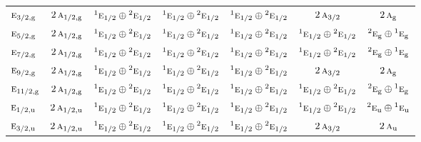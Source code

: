 \documentclass[10pt,a4paper]{article}
\numberwithin{equation}{section}
\newcommand{\irr}[1]{\text{\normalfont\scshape #1}}
\newcommand{\conjpair}[1]{{}^{#1}}
\newcommand{\ptag}[1]{\mathrm{#1}}
\begin{document}
{\begin{longtable}{@{}lcccccc@{}}
$\irr{e}_{3/2,\ptag{g}}$ & $2\,\irr{a}_{1/2,\ptag{g}}$ & $\conjpair{1}\irr{e}_{1/2}\oplus \conjpair{2}\irr{e}_{1/2}$ & $\conjpair{1}\irr{e}_{1/2}\oplus \conjpair{2}\irr{e}_{1/2}$ & $\conjpair{1}\irr{e}_{1/2}\oplus \conjpair{2}\irr{e}_{1/2}$ & $2\,\irr{a}_{3/2}$ & $2\,\irr{a}_{\ptag{g}}$\\
$\irr{e}_{5/2,\ptag{g}}$ & $2\,\irr{a}_{1/2,\ptag{g}}$ & $\conjpair{1}\irr{e}_{1/2}\oplus \conjpair{2}\irr{e}_{1/2}$ & $\conjpair{1}\irr{e}_{1/2}\oplus \conjpair{2}\irr{e}_{1/2}$ & $\conjpair{1}\irr{e}_{1/2}\oplus \conjpair{2}\irr{e}_{1/2}$ & $\conjpair{1}\irr{e}_{1/2}\oplus \conjpair{2}\irr{e}_{1/2}$ & $\conjpair{2}\irr{e}_{\ptag{g}}\oplus \conjpair{1}\irr{e}_{\ptag{g}}$\\
$\irr{e}_{7/2,\ptag{g}}$ & $2\,\irr{a}_{1/2,\ptag{g}}$ & $\conjpair{1}\irr{e}_{1/2}\oplus \conjpair{2}\irr{e}_{1/2}$ & $\conjpair{1}\irr{e}_{1/2}\oplus \conjpair{2}\irr{e}_{1/2}$ & $\conjpair{1}\irr{e}_{1/2}\oplus \conjpair{2}\irr{e}_{1/2}$ & $\conjpair{1}\irr{e}_{1/2}\oplus \conjpair{2}\irr{e}_{1/2}$ & $\conjpair{2}\irr{e}_{\ptag{g}}\oplus \conjpair{1}\irr{e}_{\ptag{g}}$\\
$\irr{e}_{9/2,\ptag{g}}$ & $2\,\irr{a}_{1/2,\ptag{g}}$ & $\conjpair{1}\irr{e}_{1/2}\oplus \conjpair{2}\irr{e}_{1/2}$ & $\conjpair{1}\irr{e}_{1/2}\oplus \conjpair{2}\irr{e}_{1/2}$ & $\conjpair{1}\irr{e}_{1/2}\oplus \conjpair{2}\irr{e}_{1/2}$ & $2\,\irr{a}_{3/2}$ & $2\,\irr{a}_{\ptag{g}}$\\
$\irr{e}_{11/2,\ptag{g}}$ & $2\,\irr{a}_{1/2,\ptag{g}}$ & $\conjpair{1}\irr{e}_{1/2}\oplus \conjpair{2}\irr{e}_{1/2}$ & $\conjpair{1}\irr{e}_{1/2}\oplus \conjpair{2}\irr{e}_{1/2}$ & $\conjpair{1}\irr{e}_{1/2}\oplus \conjpair{2}\irr{e}_{1/2}$ & $\conjpair{1}\irr{e}_{1/2}\oplus \conjpair{2}\irr{e}_{1/2}$ & $\conjpair{2}\irr{e}_{\ptag{g}}\oplus \conjpair{1}\irr{e}_{\ptag{g}}$\\
$\irr{e}_{1/2,\ptag{u}}$ & $2\,\irr{a}_{1/2,\ptag{u}}$ & $\conjpair{1}\irr{e}_{1/2}\oplus \conjpair{2}\irr{e}_{1/2}$ & $\conjpair{1}\irr{e}_{1/2}\oplus \conjpair{2}\irr{e}_{1/2}$ & $\conjpair{1}\irr{e}_{1/2}\oplus \conjpair{2}\irr{e}_{1/2}$ & $\conjpair{1}\irr{e}_{1/2}\oplus \conjpair{2}\irr{e}_{1/2}$ & $\conjpair{2}\irr{e}_{\ptag{u}}\oplus \conjpair{1}\irr{e}_{\ptag{u}}$\\
$\irr{e}_{3/2,\ptag{u}}$ & $2\,\irr{a}_{1/2,\ptag{u}}$ & $\conjpair{1}\irr{e}_{1/2}\oplus \conjpair{2}\irr{e}_{1/2}$ & $\conjpair{1}\irr{e}_{1/2}\oplus \conjpair{2}\irr{e}_{1/2}$ & $\conjpair{1}\irr{e}_{1/2}\oplus \conjpair{2}\irr{e}_{1/2}$ & $2\,\irr{a}_{3/2}$ & $2\,\irr{a}_{\ptag{u}}$\\

\end{longtable}}
\end{document}
